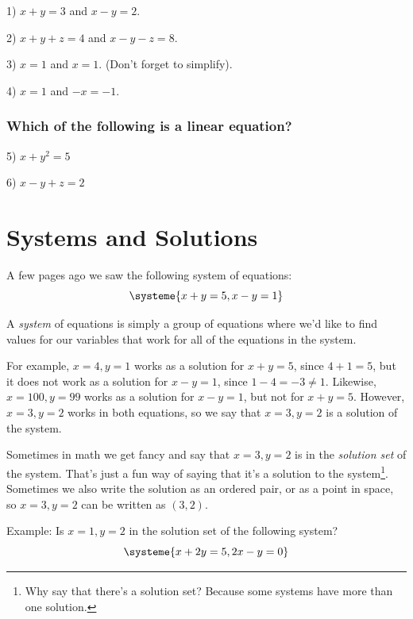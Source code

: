\documentclass[a4paper,twoside,12pt]{memoir}  %
\begin{document}
\begin{list}{}
\item 1) $x + y = 3$ and $x - y = 2$.
\item 2) $x + y + z = 4$ and $x - y - z = 8$.
\item 3) $x = 1$ and $x = 1$. (Don't forget to simplify).
\item 4) $x = 1$ and $-x = -1$.
\end{list}

\subsubsection{Which of the following is a linear equation?}
\begin{list}{}
\item 5) $x + y^2 = 5$
\item 6) $x - y  + z= 2$
\end{list}

\section{Systems and Solutions}
A few pages ago we saw the following system of equations:
\begin{equation*}
  \systeme{
    x + y = 5,
    x - y = 1
    }
\end{equation*}

A \textit{system} of equations is simply a group of equations where we'd like to find values for our variables that work for all of the equations in the system.

For example, $x=4, y=1$ works as a solution for $x+y=5$, since $4+1=5$, but it does not work as a solution for $x-y=1$, since $1-4 = -3 \neq 1$. Likewise, $x=100, y=99$ works as a solution for $x-y=1$, but not for $x+y=5$. However, $x=3,y=2$ works in both equations, so we say that $x=3, y=2$ is a solution of the system.

Sometimes in math we get fancy and say that $x=3, y=2$ is in the \textit{solution set} of the system.
That's just a fun way of saying that it's a solution to the system\footnote{Why say that there's a solution set? Because some systems have more than one solution.}.
Sometimes we also write the solution as an ordered pair, or as a point in space, so $x=3, y =2$ can be written as $(3,2)$.

Example:
Is $x=1, y =2$ in the solution set of the following system?
\begin{equation*}
  \systeme{
    x + 2y = 5,
    2x - y = 0
  }
\end{equation*}
\end{document}
